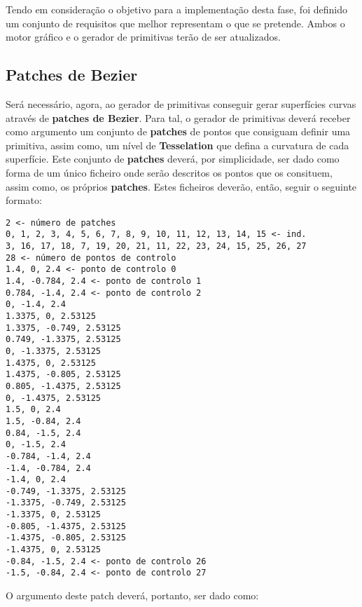 Tendo em consideração o objetivo para a implementação
desta fase, foi definido um conjunto de requisitos que
melhor representam o que se pretende.
Ambos o motor gráfico e o gerador de primitivas terão
de ser atualizados.

\subsection{Patches de Bezier}

Será necessário, agora, ao gerador de primitivas
conseguir gerar superfícies curvas através de
\textbf{patches de Bezier}.
\newline
\break
\noindent
Para tal, o gerador de primitivas deverá receber
como argumento um conjunto de \textbf{patches} de
pontos que consiguam definir uma primitiva, assim como,
um nível de \textbf{Tesselation} que defina a curvatura
de cada superfície.
\newline
\break
\noindent
Este conjunto de \textbf{patches} deverá, por simplicidade,
ser dado como forma de um único ficheiro onde serão descritos
os pontos que os consituem, assim como, os próprios
\textbf{patches}.
\newline
\break
\noindent
Estes ficheiros deverão, então, seguir o seguinte formato:
\newline

\begin{tcolorbox}[
    colback=blue!10!white,
    colframe=black!50!black,
]
\begin{verbatim}
2 <- número de patches
0, 1, 2, 3, 4, 5, 6, 7, 8, 9, 10, 11, 12, 13, 14, 15 <- ind.
3, 16, 17, 18, 7, 19, 20, 21, 11, 22, 23, 24, 15, 25, 26, 27
28 <- número de pontos de controlo
1.4, 0, 2.4 <- ponto de controlo 0
1.4, -0.784, 2.4 <- ponto de controlo 1
0.784, -1.4, 2.4 <- ponto de controlo 2
0, -1.4, 2.4
1.3375, 0, 2.53125
1.3375, -0.749, 2.53125
0.749, -1.3375, 2.53125
0, -1.3375, 2.53125
1.4375, 0, 2.53125
1.4375, -0.805, 2.53125
0.805, -1.4375, 2.53125
0, -1.4375, 2.53125
1.5, 0, 2.4
1.5, -0.84, 2.4
0.84, -1.5, 2.4
0, -1.5, 2.4
-0.784, -1.4, 2.4
-1.4, -0.784, 2.4
-1.4, 0, 2.4
-0.749, -1.3375, 2.53125
-1.3375, -0.749, 2.53125
-1.3375, 0, 2.53125
-0.805, -1.4375, 2.53125
-1.4375, -0.805, 2.53125
-1.4375, 0, 2.53125
-0.84, -1.5, 2.4 <- ponto de controlo 26
-1.5, -0.84, 2.4 <- ponto de controlo 27
\end{verbatim}
\end{tcolorbox}

\vspace{12pt}
\noindent
O argumento deste patch deverá, portanto, ser dado como:

